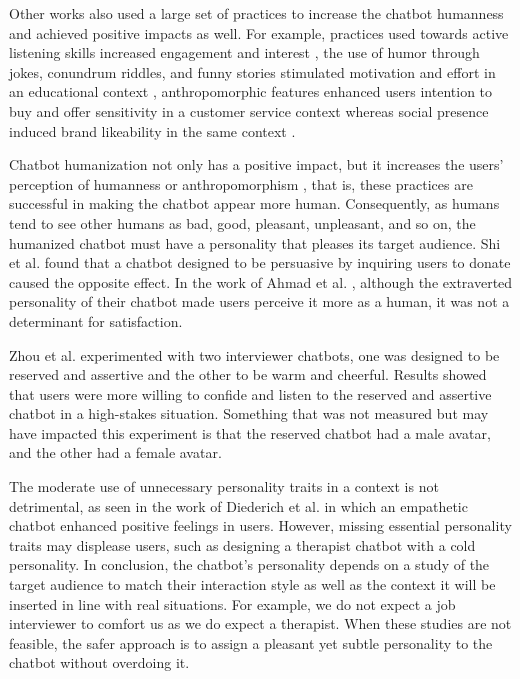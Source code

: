 Other works also used a large set of practices to increase the chatbot humanness and achieved positive impacts as well. For example, practices used towards active listening skills increased engagement and interest , the use of humor through jokes, conundrum riddles, and funny stories stimulated motivation and effort in an educational context , anthropomorphic features enhanced users intention to buy and offer sensitivity in a customer service context  whereas social presence induced brand likeability in the same context .

Chatbot humanization not only has a positive impact, but it increases the users' perception of humanness or anthropomorphism , that is, these practices are successful in making the chatbot appear more human. Consequently, as humans tend to see other humans as bad, good, pleasant, unpleasant, and so on, the humanized chatbot must have a personality that pleases its target audience. Shi et al.  found that a chatbot designed to be persuasive by inquiring users to donate caused the opposite effect. In the work of Ahmad et al. , although the extraverted personality of their chatbot made users perceive it more as a human, it was not a determinant for satisfaction.

Zhou et al.  experimented with two interviewer chatbots, one was designed to be reserved and assertive and the other to be warm and cheerful. Results showed that users were more willing to confide and listen to the reserved and assertive chatbot in a high-stakes situation. Something that was not measured but may have impacted this experiment is that the reserved chatbot had a male avatar, and the other had a female avatar.

The moderate use of unnecessary personality traits in a context is not detrimental, as seen in the work of Diederich et al.  in which an empathetic chatbot enhanced positive feelings in users. However, missing essential personality traits may displease users, such as designing a therapist chatbot with a cold personality. In conclusion, the chatbot's personality depends on a study of the target audience to match their interaction style as well as the context it will be inserted in line with real situations. For example, we do not expect a job interviewer to comfort us as we do expect a therapist. When these studies are not feasible, the safer approach is to assign a pleasant yet subtle personality to the chatbot without overdoing it.

